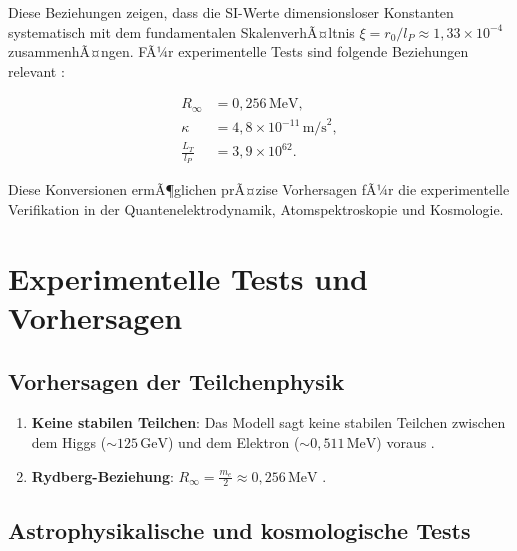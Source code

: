﻿\documentclass[twocolumn,aps,prl]{revtex4-2}
\begin{document}
{{{{{{{{{{{{{{{																	Diese Beziehungen zeigen, dass die SI-Werte dimensionsloser Konstanten systematisch mit dem fundamentalen SkalenverhÃ¤ltnis \(\xi = r_0/l_P \approx 1{,}33 \times 10^{-4}\) zusammenhÃ¤ngen. FÃ¼r experimentelle Tests sind folgende Beziehungen relevant \cite{pascher_alpha_2025}:
																	
																	\begin{align}
																		R_{\infty} &= 0{,}256 \, \text{MeV}, \label{eq:rydberg} \\
																		\kappa &= 4{,}8 \times 10^{-11} \, \text{m/s}^2, \label{eq:kappa} \\
																		\frac{L_T}{l_P} &= 3{,}9 \times 10^{62}. \label{eq:lt_to_lp}
																	\end{align}
																	
																	Diese Konversionen ermÃ¶glichen prÃ¤zise Vorhersagen fÃ¼r die experimentelle Verifikation in der Quantenelektrodynamik, Atomspektroskopie und Kosmologie.
																	
																	\section{Experimentelle Tests und Vorhersagen}
																	\label{sec:outlook}
																	
																	\subsection{Vorhersagen der Teilchenphysik}
																	\label{subsec:particle_predictions}
																	
																	\begin{enumerate}
																		\item \textbf{Keine stabilen Teilchen}: Das Modell sagt keine stabilen Teilchen zwischen dem Higgs (\(\sim 125 \, \text{GeV}\)) und dem Elektron (\(\sim 0{,}511 \, \text{MeV}\)) voraus \cite{ATLAS2012, CMS2012, Ellis1976}.
																		\item \textbf{Rydberg-Beziehung}: \(R_\infty = \frac{m_e}{2} \approx 0{,}256 \, \text{MeV}\) \cite{Hansch2006, Udem2002}.
																	\end{enumerate}
																	
																	\subsection{Astrophysikalische und kosmologische Tests}
																	\label{subsec:astro_tests}
																	
}}}}}}}}}}}}}}}
\end{document}
